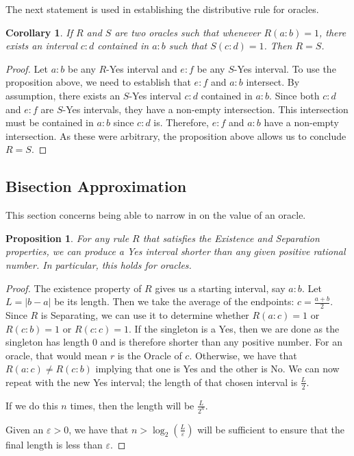 \documentclass[12pt]{article}
\newtheorem{corollary}{Corollary}[subsection]
\newtheorem{proposition}{Proposition}[subsection]
\begin{document}
The next statement is used in establishing the distributive rule for oracles. 

\begin{corollary}
    If $R$ and $S$ are two oracles such that whenever $R(a:b) = 1$, there exists an interval $c:d$ contained in $a:b$ such that $S(c:d) = 1$. Then $R=S$.
\end{corollary}

\begin{proof}
Let $a:b$ be any $R$-Yes interval and $e:f$ be any $S$-Yes interval. To use the proposition above, we need to establish that $e:f$ and $a:b$ intersect. By assumption, there exists an $S$-Yes interval $c:d$ contained in $a:b$. Since both $c:d$ and $e:f$ are $S$-Yes intervals, they have a non-empty intersection. This intersection must be contained in $a:b$ since $c:d$ is. Therefore, $e:f$ and $a:b$ have a non-empty intersection. As these were arbitrary, the proposition above allows us to conclude $R=S$.
\end{proof}


\subsection{Bisection Approximation}

This section concerns being able to narrow in on the value of an oracle. 

\begin{proposition}\label{pr:short}
For any rule $R$ that satisfies the Existence and Separation properties, we can produce a Yes interval shorter than any given positive rational number. In particular, this holds for oracles. 
\end{proposition}

\begin{proof}
The existence property of $R$ gives us a starting interval, say $a:b$. Let $L = |b-a|$ be its length. Then we take the average of the endpoints: $c = \frac{a+b}{2}$. Since $R$ is Separating, we can use it to determine whether $R(a:c) = 1$ or $R(c:b) = 1$ or $R(c:c) = 1$. If the singleton is a Yes, then we are done as the singleton has length 0 and is therefore shorter than any positive number. For an oracle, that would mean $r$ is the Oracle of $c$. Otherwise, we have that $R(a:c) \neq R(c:b)$ implying that one is Yes and the other is No. We can now repeat with the new Yes interval; the length of that chosen interval is $\frac{L}{2}$. 

If we do this $n$ times, then the length will be $\frac{L}{2^n}$. 

Given an $\varepsilon >0 $, we have that $n > \log_2 (\frac{L}{\varepsilon})$ will be sufficient to ensure that the final length is less than $\varepsilon$. 
    \end{proof}
\end{document}
